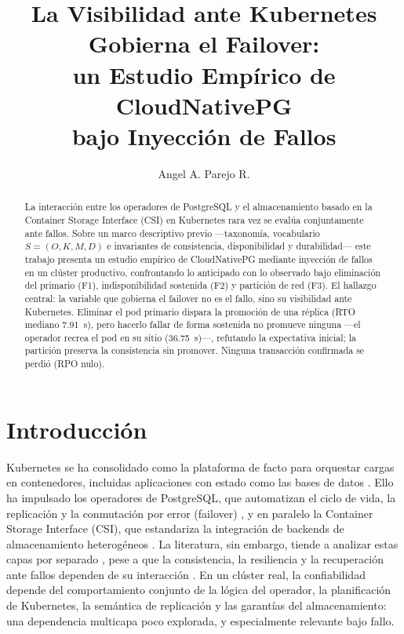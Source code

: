 \documentclass[a4paper]{llncs}
\begin{document}
\mainmatter

\title{La Visibilidad ante Kubernetes Gobierna el Failover:\\
un Estudio Empírico de CloudNativePG\\ bajo Inyección de Fallos}

\author{Angel A. Parejo R.}

\maketitle

\begin{abstract}
La interacción entre los operadores de PostgreSQL y el almacenamiento
basado en la Container Storage Interface (CSI) en Kubernetes rara vez se
evalúa conjuntamente ante fallos. Sobre un marco descriptivo previo
---taxonomía, vocabulario $S=(O,K,M,D)$ e invariantes de consistencia,
disponibilidad y durabilidad--- este trabajo presenta un estudio empírico de
CloudNativePG mediante inyección de fallos en un clúster productivo,
confrontando lo anticipado con lo observado bajo eliminación del primario (F1),
indisponibilidad sostenida (F2) y partición de red (F3). El hallazgo central:
la variable que gobierna el failover no es el fallo, sino su visibilidad ante
Kubernetes. Eliminar el pod primario dispara la promoción de una réplica (RTO
mediano 7.91~s), pero hacerlo fallar de forma sostenida no promueve ninguna
---el operador recrea el pod en su sitio (36.75~s)---, refutando la expectativa
inicial; la partición preserva la consistencia sin promover. Ninguna transacción
confirmada se perdió (RPO nulo).
\end{abstract}

\section{Introducción}

Kubernetes se ha consolidado como la plataforma de facto para orquestar cargas
en contenedores, incluidas aplicaciones con estado como las bases de datos
\cite{burns2016}. Ello ha impulsado los operadores de
PostgreSQL, que automatizan el ciclo de vida, la replicación y la conmutación
por error (failover) \cite{k8soperator,dobies2020}, y en paralelo la Container
Storage Interface (CSI), que estandariza la integración de backends de
almacenamiento heterogéneos \cite{csi}. La literatura, sin embargo, tiende a
analizar estas capas por separado \cite{bailis2013,gilbert2002,khan2023}, pese
a que la consistencia, la resiliencia y la recuperación ante fallos dependen de
su interacción \cite{avizienis2004}. En un clúster real, la confiabilidad
depende del comportamiento conjunto de la lógica del operador, la planificación
de Kubernetes, la semántica de replicación y las garantías del almacenamiento:
una dependencia multicapa poco explorada, y especialmente relevante bajo fallo.
\end{document}
